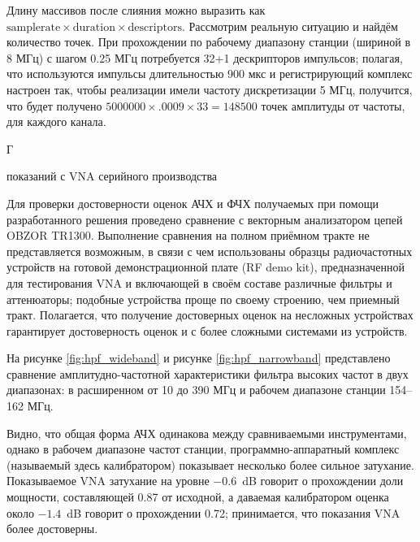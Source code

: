 \documentclass{report}
\begin{document}
Длину массивов после слияния можно выразить как $\text{samplerate} \times \text{duration} \times \text{descriptors}$. Рассмотрим реальную ситуацию и найдём количество точек. При прохождении по рабочему диапазону станции (шириной в 8 МГц) с шагом 0.25 МГц потребуется 32+1 дескрипторов импульсов; полагая, что используются импульсы  длительностью 900 мкс и регистрирующий комплекс настроен так, чтобы реализации имели частоту дискретизации 5 МГц, получится, что будет получено $5000000 \times .0009 \times 33 = 148500$ точек амплитуды от частоты, для каждого канала.

\pagebreak
\begin{flushright}
     Г
\end{flushright}

\begin{center}   показаний с VNA серийного производства\end{center}

Для проверки достоверности оценок АЧХ и ФЧХ получаемых при помощи разработанного решения  проведено сравнение с векторным анализатором цепей OBZOR TR1300. Выполнение сравнения на полном приёмном тракте не представляется возможным, в связи с чем использованы образцы радиочастотных устройств на готовой демонстрационной плате (RF demo kit), предназначенной для тестирования VNA и включающей в своём составе различные фильтры и аттенюаторы; подобные устройства проще по своему строению, чем приемный тракт. Полагается, что получение достоверных оценок на несложных устройствах гарантирует достоверность оценок и с более сложными системами из устройств.

На рисунке \ref{fig:hpf_wideband} и рисунке \ref{fig:hpf_narrowband} представлено сравнение амплитудно-частотной характеристики фильтра высоких частот в двух диапазонах: в расширенном от 10 до 390 МГц и рабочем диапазоне станции 154--162 МГц.



Видно, что общая форма АЧХ одинакова между сравниваемыми инструментами, однако в рабочем диапазоне частот станции, программно-аппаратный комплекс (называемый здесь калибратором) показывает несколько более сильное затухание. Показываемое VNA затухание на уровне $-0.6$~dB говорит о прохождении доли мощности, составляющей 0.87 от исходной, а даваемая калибратором оценка около $-1.4$~dB говорит о прохождении 0.72; принимается, что показания VNA более достоверны.
\end{document}
